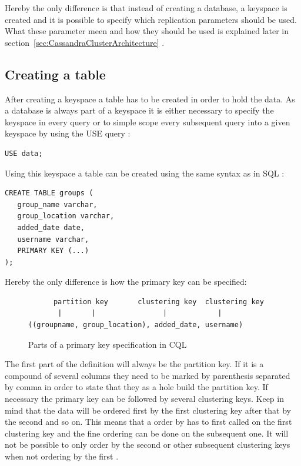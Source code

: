 Hereby the only difference is that instead of creating a database, a keyspace is created and it is possible to specify which replication parameters should be used. What these parameter meen and how they should be used is explained later in section~\ref{sec:CassandraClusterArchitecture} \autocite{cqlAlexMeng}.

\subsection{Creating a table}
After creating a keyspace a table has to be created in order to hold the data. As a database is always part of a keyspace it is either necessary to specify the keyspace in every query or to simple scope every subsequent query into a given keyspace by using the USE query \autocite{cassandra3cqldocUse}:
\begin{verbatim}
USE data;
\end{verbatim}

Using this keyspace a table can be created using the same syntax as in SQL \autocite{cqlAlexMeng, newInCQL3, cassandra3cqldocCreateTable}:
\begin{verbatim}
CREATE TABLE groups (
   group_name varchar,
   group_location varchar,
   added_date date,
   username varchar,
   PRIMARY KEY (...)
);
\end{verbatim}

Hereby the only difference is how the primary key can be specified:
\begin{figure}[ht]
    \centering
\begin{verbatim}
      partition key       clustering key  clustering key
       |       |                |            |
((groupname, group_location), added_date, username)
\end{verbatim}
    \caption{Parts of a primary key specification in CQL \autocite{cqlPrimaryKeyDefinition}}
    \label{fig:cassandra:primaryKeyDefinition}
\end{figure}
The first part of the definition will always be the partition key. If it is a compound of several columns they need to be marked by parenthesis separated by comma in order to state that they as a hole build the partition key. If necessary the primary key can be followed by several clustering keys. Keep in mind that the data will be ordered first by the first clustering key after that by the second and so on. This means that a order by has to first called on the first clustering key and the fine ordering can be done on the subsequent one. It will not be possible to only order by the second or other subsequent clustering keys when not ordering by the first \autocite{cqlPrimaryKeyDefinition, cassandra3cqldocCreateTable}.

